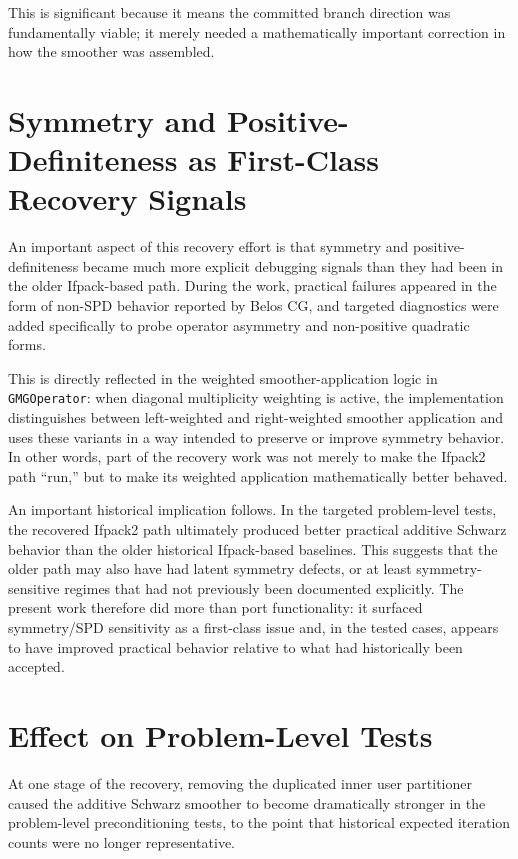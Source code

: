 \documentclass[11pt]{article}
\begin{document}
This is significant because it means the committed branch direction was fundamentally viable; it merely needed a mathematically important correction in how the smoother was assembled.

\section{Symmetry and Positive-Definiteness as First-Class Recovery Signals}
An important aspect of this recovery effort is that symmetry and positive-definiteness became much more explicit debugging signals than they had been in the older Ifpack-based path. During the work, practical failures appeared in the form of non-SPD behavior reported by Belos CG, and targeted diagnostics were added specifically to probe operator asymmetry and non-positive quadratic forms.

This is directly reflected in the weighted smoother-application logic in \texttt{GMGOperator}: when diagonal multiplicity weighting is active, the implementation distinguishes between left-weighted and right-weighted smoother application and uses these variants in a way intended to preserve or improve symmetry behavior. In other words, part of the recovery work was not merely to make the Ifpack2 path ``run,'' but to make its weighted application mathematically better behaved.

An important historical implication follows. In the targeted problem-level tests, the recovered Ifpack2 path ultimately produced better practical additive Schwarz behavior than the older historical Ifpack-based baselines. This suggests that the older path may also have had latent symmetry defects, or at least symmetry-sensitive regimes that had not previously been documented explicitly. The present work therefore did more than port functionality: it surfaced symmetry/SPD sensitivity as a first-class issue and, in the tested cases, appears to have improved practical behavior relative to what had historically been accepted.

\section{Effect on Problem-Level Tests}
At one stage of the recovery, removing the duplicated inner user partitioner caused the additive Schwarz smoother to become dramatically stronger in the problem-level preconditioning tests, to the point that historical expected iteration counts were no longer representative.
\end{document}
